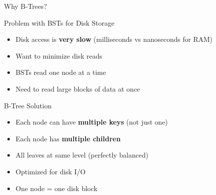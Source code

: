 \documentclass[aspectratio=169,xcolor=dvipsnames]{beamer}
\begin{document}
\begin{frame}{Why B-Trees?}
  \begin{alertblock}{Problem with BSTs for Disk Storage}
    \begin{itemize}
      \item Disk access is \textbf{very slow} (milliseconds vs nanoseconds for RAM)
      \item Want to minimize disk reads
      \item BSTs read one node at a time
      \item Need to read large blocks of data at once
    \end{itemize}
  \end{alertblock}

  \vspace{0.3cm}

  \begin{block}{B-Tree Solution}
    \begin{itemize}
      \item Each node can have \textbf{multiple keys} (not just one)
      \item Each node has \textbf{multiple children}
      \item All leaves at same level (perfectly balanced)
      \item Optimized for disk I/O
      \item One node = one disk block
    \end{itemize}
  \end{block}
\end{frame}
\end{document}
